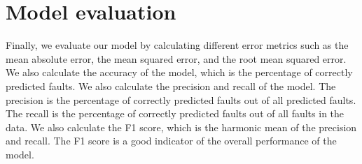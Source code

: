 \section{Model evaluation}
\label{sec:model_evaluation}

Finally, we evaluate our model by calculating different error metrics such as the mean absolute error, the mean squared error, and the root mean squared error. We also calculate the accuracy of the model, which is the percentage of correctly predicted faults. We also calculate the precision and recall of the model. The precision is the percentage of correctly predicted faults out of all predicted faults. The recall is the percentage of correctly predicted faults out of all faults in the data. We also calculate the F1 score, which is the harmonic mean of the precision and recall. The F1 score is a good indicator of the overall performance of the model.